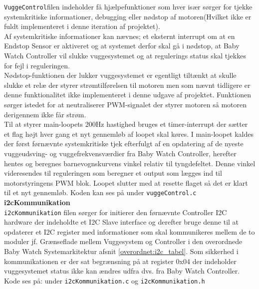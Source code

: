 \verb+VuggeControl+filen indeholder få hjælpefunktioner som hver især sørger for tjekke systemkritiske informationer, debugging eller nødstop af motoren(Hvilket ikke er fuldt implementeret i denne iteration af projektet). \\

Af systemkritiske informationer kan nævnes; et eksternt interrupt om at en Endstop Sensor er aktiveret og at systemet derfor skal gå i nødstop, at Baby Watch Controller vil slukke vuggesystemet og at regulerings status skal tjekkes for fejl i reguleringen.\\ 

Nødstop-funktionen der lukker vuggesystemet er egentligt tiltænkt at skulle slukke et relæ der styrer strømtilførelsen til motoren men som nævnt tidligere er denne funktionalitet ikke implementeret i denne udgave af projektet. Funktionen sørger istedet for at neutraliserer PWM-signalet der styrer motoren så motoren derigennem ikke får strøm. \\ 

Til at styrer main-loopets 200Hz hastighed bruges et timer-interrupt der sætter et flag højt hver gang et nyt gennemløb af loopet skal køres. I main-loopet kaldes der først førnævnte systemkritiske tjek efterfulgt af en opdatering af de nyeste vuggeudsving- og vuggefrekvensværdier fra Baby Watch Controller, herefter hentes og beregnes barnevognskurvens vinkel relativ til tyngdefeltet. Denne vinkel videresendes til reguleringen som beregner et output som lægges ind til motorstyringens PWM blok. Loopet slutter med at resette flaget så det er klart til et nyt gennemløb. Koden kan ses på \citep{cd} under \verb+vuggeControl.c+ \\

\label{vugsys:impl, i2cKommunikation}\textbf{i2cKommunikation} \\ \verb+i2cKommunikation+ filen sørger for initierer den førnævnte Controller I2C hardware der indeholdte et I2C Slave interface og derefter bruge denne til at opdaterer et I2C register med informationer som skal kommunikeres mellem de to moduler jf. Grænseflade mellem Vuggesystem og Controller i den overordnede Baby Watch Systemarkitektur afsnit \ref{overordnet:i2c_tabel}. Som sikkerhed i kommunikationen er der sat begrænsning på at register 0x04 der indeholder vuggesystemet status ikke kan ændres udfra dvs. fra Baby Watch Controller. Kode ses på: \citep{cd} under \verb+i2cKommunikation.c+ og \verb+i2cKommunikation.h+\\


